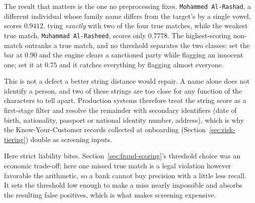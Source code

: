 \documentclass[../ai_in_finance]{subfiles}
\begin{document}
The result that matters is the one no preprocessing fixes. \texttt{Mohammed Al-Rashad}, a different individual whose family name differs from the target's by a single vowel, scores $0.9412$, tying \emph{exactly} with two of the four true matches, while the weakest true match, \texttt{Muhammad Al-Rasheed}, scores only $0.7778$. The highest-scoring non-match outranks a true match, and no threshold separates the two classes: set the bar at $0.90$ and the engine clears a sanctioned party while flagging an innocent one; set it at $0.75$ and it catches everything by flagging almost everyone.

This is not a defect a better string distance would repair. A name alone does not identify a person, and two of these strings are too close for any function of the characters to tell apart. Production systems therefore treat the string score as a first-stage filter and resolve the remainder with secondary identifiers (date of birth, nationality, passport or national identity number, address), which is why the Know-Your-Customer records collected at onboarding (Section~\ref{sec:risk-tiering}) double as screening inputs.

Here strict liability bites. Section~\ref{sec:fraud-scoring}'s threshold choice was an economic trade-off; here one missed true match is a legal violation however favorable the arithmetic, so a bank cannot buy precision with a little less recall. It sets the threshold low enough to make a miss nearly impossible and absorbs the resulting false positives, which is what makes screening expensive.
\end{document}
